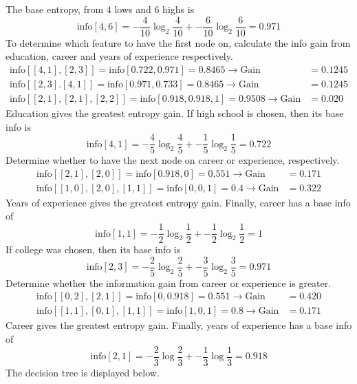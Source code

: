 \documentclass[12pt]{article}
\newcommand{\info}{\text{info}}
\begin{document}
The base entropy, from $4$ lows and $6$ highs is
$$ \info[4,6] = -\frac{4}{10}\log_2 \frac{4}{10} + -\frac{6}{10}\log_2 \frac{6}{10} = 0.971$$ 
To determine which feature to have the first node on, calculate the info gain from education, career and years of experience respectively. $$ \begin{aligned} 
\info[[4,1], [2,3]] = \info[0.722, 0.971] = 0.8465 \to \text{Gain} &= 0.1245 \\
\info[[2,3].[4,1]] = \info[0.971, 0.733] = 0.8465 \to \text{Gain} &= 0.1245 \\
\info[[2,1],[2,1],[2,2]] = \info[0.918, 0.918,1] = 0.9508 \to \text{Gain} &= 0.020 \end{aligned} $$ 
Education gives the greatest entropy gain. If high school is chosen, then its base info is $$ \info[4,1] = -\frac{4}{5}\log_2 \frac{4}{5} + -\frac{1}{5}\log_2 \frac{1}{5} = 0.722 $$
Determine whether to have the next node on career or experience, respectively. 
$$ \begin{aligned} 
\info[[2,1], [2,0]] = \info[0.918, 0] =  0.551 \to \text{Gain} &= 0.171 \\ 
\info[[1,0],[2,0],[1,1]] = \info[0,0,1] = 0.4 \to \text{Gain} &= 0.322 \end{aligned} $$ 
Years of experience gives the greatest entropy gain. Finally, career has a base info of $$ \info[1,1] = -\frac{1}{2}\log_2 \frac{1}{2} + -\frac{1}{2}\log_2 \frac{1}{2} = 1 $$ 
\newpage
If college was chosen, then its base info is $$ \info[2,3] = -\frac{2}{5}\log_2 \frac{2}{5} + -\frac{3}{5}\log_2 \frac{3}{5} = 0.971 $$ 
Determine whether the information gain from career or experience is greater. 
$$ \begin{aligned} 
\info[[0,2],[2,1]] = \info[0, 0.918] = 0.551 \to \text{Gain} &= 0.420 \\
\info[[1,1],[0,1],[1,1]] = \info[1,0,1] = 0.8 \to \text{Gain} &= 0.171 \end{aligned} $$ 
Career gives the greatest entropy gain. Finally, years of experience has a base info of $$ \info[2,1] = -\frac{2}{3}\log \frac{2}{3} + -\frac{1}{3}\log \frac{1}{3} = 0.918 $$ 
The decision tree is displayed below. 
\end{document}
